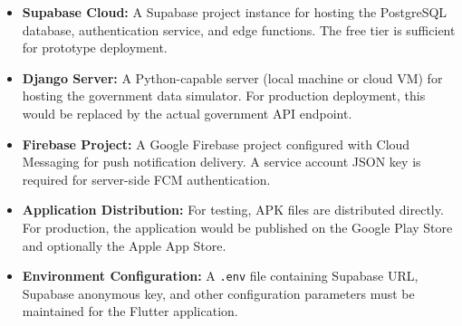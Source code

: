 \begin{itemize}
    \item \textbf{Supabase Cloud:} A Supabase project instance for hosting the PostgreSQL database, authentication service, and edge functions. The free tier is sufficient for prototype deployment.

    \item \textbf{Django Server:} A Python-capable server (local machine or cloud VM) for hosting the government data simulator. For production deployment, this would be replaced by the actual government API endpoint.

    \item \textbf{Firebase Project:} A Google Firebase project configured with Cloud Messaging for push notification delivery. A service account JSON key is required for server-side FCM authentication.

    \item \textbf{Application Distribution:} For testing, APK files are distributed directly. For production, the application would be published on the Google Play Store and optionally the Apple App Store.

    \item \textbf{Environment Configuration:} A \texttt{.env} file containing Supabase URL, Supabase anonymous key, and other configuration parameters must be maintained for the Flutter application.
\end{itemize}
